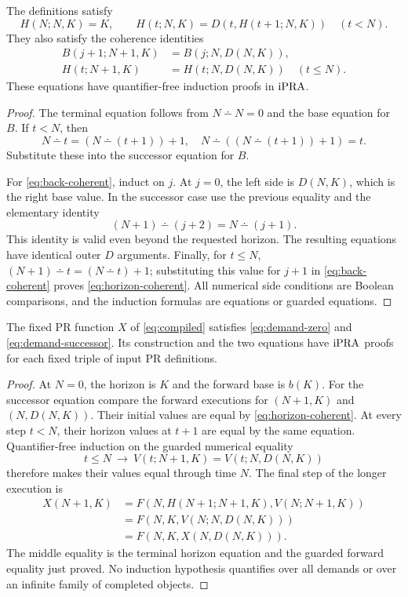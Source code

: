 \begin{lemma}
\label{lem:horizon}
The definitions satisfy
\[
 H(N;N,K)=K,\qquad
 H(t;N,K)=D(t,H(t+1;N,K))\quad(t<N).
\]
They also satisfy the coherence identities
\begin{align}
 B(j+1;N+1,K)&=B(j;N,D(N,K)),\label{eq:back-coherent}\\
 H(t;N+1,K)&=H(t;N,D(N,K))\quad(t\le N).
 \label{eq:horizon-coherent}
\end{align}
These equations have quantifier-free induction proofs in \(\mathrm{iPRA}\).
\end{lemma}

\begin{proof}
The terminal equation follows from \(N\dotminus N=0\) and the base
equation for \(B\). If \(t<N\), then
\[
 N\dotminus t=(N\dotminus(t+1))+1,
 \quad
 N\dotminus((N\dotminus(t+1))+1)=t.
\]
Substitute these into the successor equation for \(B\).

For \eqref{eq:back-coherent}, induct on \(j\). At \(j=0\), the left
side is \(D(N,K)\), which is the right base value. In the successor
case use the previous equality and the elementary identity
\[
 (N+1)\dotminus(j+2)=N\dotminus(j+1).
\]
This identity is valid even beyond the requested horizon. The resulting
equations have identical outer \(D\) arguments. Finally, for \(t\le N\),
\((N+1)\dotminus t=(N\dotminus t)+1\); substituting this value for
\(j+1\) in \eqref{eq:back-coherent} proves
\eqref{eq:horizon-coherent}. All numerical side conditions are Boolean
comparisons, and the induction formulas are equations or guarded equations.
\end{proof}

\begin{theorem}
\label{thm:demand}
The fixed PR function \(X\) of \eqref{eq:compiled} satisfies
\eqref{eq:demand-zero} and \eqref{eq:demand-successor}. Its construction
and the two equations have \(\mathrm{iPRA}\) proofs for each fixed triple of
input PR definitions.
\end{theorem}

\begin{proof}
At \(N=0\), the horizon is \(K\) and the forward base is \(b(K)\).
For the successor equation compare the forward executions for
\((N+1,K)\) and \((N,D(N,K))\). Their initial values are equal by
\eqref{eq:horizon-coherent}. At every step \(t<N\), their horizon
values at \(t+1\) are equal by the same equation. Quantifier-free
induction on the guarded numerical equality
\[
 t\le N\ \longrightarrow\
 V(t;N+1,K)=V(t;N,D(N,K))
\]
therefore makes their values equal through time \(N\). The final step
of the longer execution is
\begin{align*}
 X(N+1,K)
 &=F(N,H(N+1;N+1,K),V(N;N+1,K))\\
 &=F(N,K,V(N;N,D(N,K)))\\
 &=F(N,K,X(N,D(N,K))).
\end{align*}
The middle equality is the terminal horizon equation and the guarded
forward equality just proved. No induction hypothesis quantifies over
all demands or over an infinite family of completed objects.
\end{proof}

